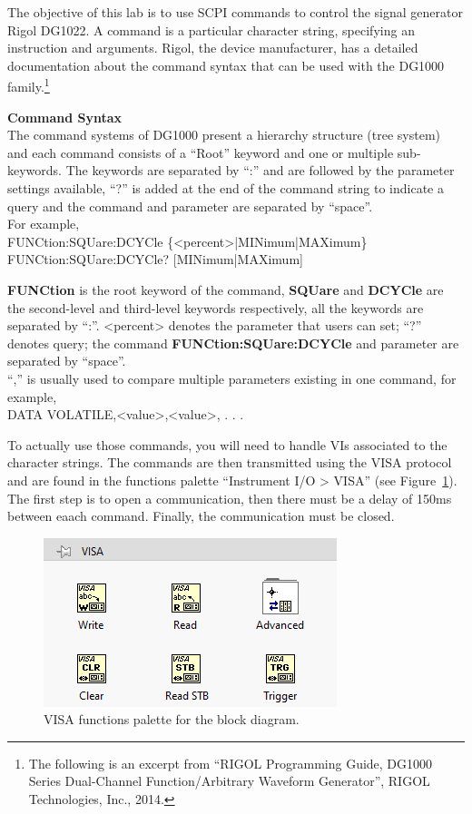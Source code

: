 \documentclass{labo}
\author{GEI}
\begin{document}

The objective of this lab is to use SCPI commands to control the signal generator Rigol DG1022.
A command is a particular character string, specifying an instruction and arguments.
Rigol, the device manufacturer, has a detailed documentation about the command syntax that can be used with the DG1000 family.\footnote{The following is an excerpt from “RIGOL Programming Guide, DG1000 Series Dual-Channel Function/Arbitrary Waveform Generator”, RIGOL Technologies, Inc., 2014.}

\begin{leftbar}
{\Large{\textbf{Command Syntax}}}\\
The command systems of DG1000 present a hierarchy structure (tree system) and each command consists of a “Root” keyword and one or multiple sub-keywords. 
The keywords are separated by “:” and are followed by the parameter settings available, “?” is added at the end of the command string to indicate a query and the command and parameter are separated by “space”.\\

For example,\\
FUNCtion:SQUare:DCYCle \{<percent>|MINimum|MAXimum\}\\
FUNCtion:SQUare:DCYCle? [MINimum|MAXimum]

\textbf{FUNCtion} is the root keyword of the command, \textbf{SQUare} and \textbf{DCYCle} are the
second-level and third-level keywords respectively, all the keywords are separated by
“:”. <percent> denotes the parameter that users can set; “?” denotes query; the
command \textbf{FUNCtion:SQUare:DCYCle} and parameter are separated by “space”.\\

“,” is usually used to compare multiple parameters existing in one command, for
example,\\
DATA VOLATILE,<value>,<value>, . . .
\end{leftbar}


To actually use those commands, you will need to handle VIs associated to the character strings.
The commands are then transmitted using the VISA protocol and are found in the functions palette “Instrument I/O > VISA” (see Figure~\ref{fig:visa}).
The first step is to open a communication, then there must be a delay of 150ms between eaach command.
Finally, the communication must be closed.\\

\begin{figure}[ht!]
\centering
\includegraphics[scale=0.8]{functions-palette-visa.png}
\caption{VISA functions palette for the block diagram.}
\label{fig:visa}
\end{figure}
\end{document}
